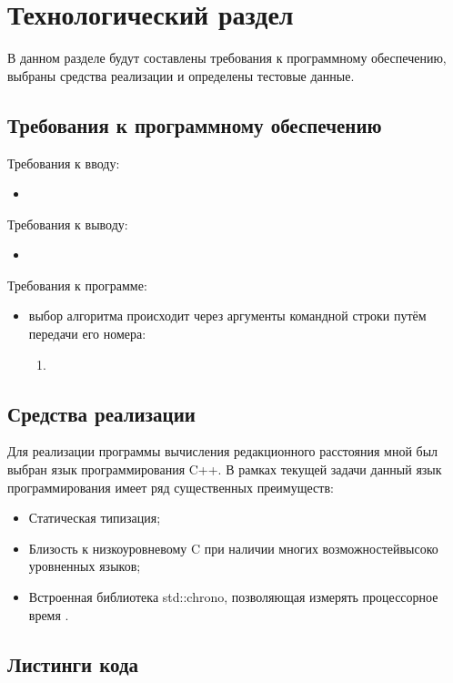 \chapter{Технологический раздел}
\label{cha:impl}

В данном разделе будут составлены требования к программному обеспечению, выбраны средства реализации и определены тестовые данные.

\section{Требования к программному обеспечению}
Требования к вводу:
\begin{itemize}
    \item
\end{itemize}
Требования к выводу:
\begin{itemize}
    \item
\end{itemize}
Требования к программе:
\begin{itemize}
    \item выбор алгоритма происходит через аргументы командной строки путём передачи его номера:
        \begin{enumerate}[1)]
            \item
        \end{enumerate}
\end{itemize}

\section{Средства реализации}
Для реализации программы вычисления редакционного расстояния мной был выбран язык программирования C++. В рамках текущей задачи данный язык программирования имеет ряд существенных преимуществ:
\begin{itemize}
    \item Статическая типизация;
    \item Близость к низкоуровневому C при наличии многих возможностейвысоко уровненных языков;
    \item Встроенная библиотека std::chrono, позволяющая измерять процессорное время \cite{chronoart}.
\end{itemize}

\section{Листинги кода}

